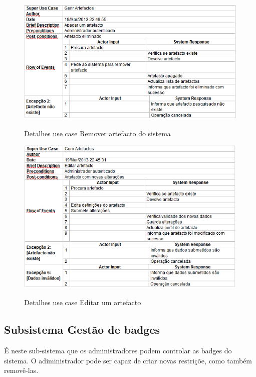 \documentclass[12pt,a4paper]{article}
\begin{document}
\begin{figure}[h!]
\centering
\includegraphics[scale=0.7]{d_usecase/A_removerartefacto}
\label{usecase}
\caption{Detalhes use case Remover artefacto do sistema}
\end{figure}

\begin{figure}[h!]
\centering
\includegraphics[scale=0.7]{d_usecase/A_editarartefacto}
\label{usecase}
\caption{Detalhes use case Editar um artefacto}
\end{figure}

\clearpage

\subsection{Subsistema Gestão de badges}
É neste sub-sistema que os administradores podem controlar as badges do sistema. O
adiministrador pode ser capaz de criar novas restriçõe, como também removê-las.\\
\end{document}
